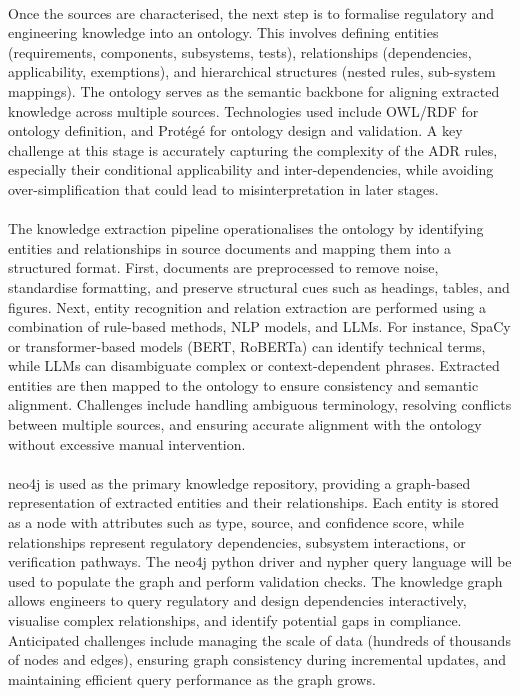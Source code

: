         \paragraph{} Once the sources are characterised, the next step is to formalise regulatory and engineering knowledge into an ontology. This involves defining entities (requirements, components, subsystems, tests), relationships (dependencies, applicability, exemptions), and hierarchical structures (nested rules, sub-system mappings). The ontology serves as the semantic backbone for aligning extracted knowledge across multiple sources. Technologies used include OWL/RDF for ontology definition, and Protégé for ontology design and validation. A key challenge at this stage is accurately capturing the complexity of the ADR rules, especially their conditional applicability and inter-dependencies, while avoiding over-simplification that could lead to misinterpretation in later stages.

        \paragraph{} The knowledge extraction pipeline operationalises the ontology by identifying entities and relationships in source documents and mapping them into a structured format. First, documents are preprocessed to remove noise, standardise formatting, and preserve structural cues such as headings, tables, and figures. Next, entity recognition and relation extraction are performed using a combination of rule-based methods, NLP models, and LLMs. For instance, SpaCy or transformer-based models (BERT, RoBERTa) can identify technical terms, while LLMs can disambiguate complex or context-dependent phrases. Extracted entities are then mapped to the ontology to ensure consistency and semantic alignment. Challenges include handling ambiguous terminology, resolving conflicts between multiple sources, and ensuring accurate alignment with the ontology without excessive manual intervention.

        \paragraph{} neo4j is used as the primary knowledge repository, providing a graph-based representation of extracted entities and their relationships. Each entity is stored as a node with attributes such as type, source, and confidence score, while relationships represent regulatory dependencies, subsystem interactions, or verification pathways. The neo4j python driver and nypher query language will be used to populate the graph and perform validation checks. The knowledge graph allows engineers to query regulatory and design dependencies interactively, visualise complex relationships, and identify potential gaps in compliance. Anticipated challenges include managing the scale of data (hundreds of thousands of nodes and edges), ensuring graph consistency during incremental updates, and maintaining efficient query performance as the graph grows.

